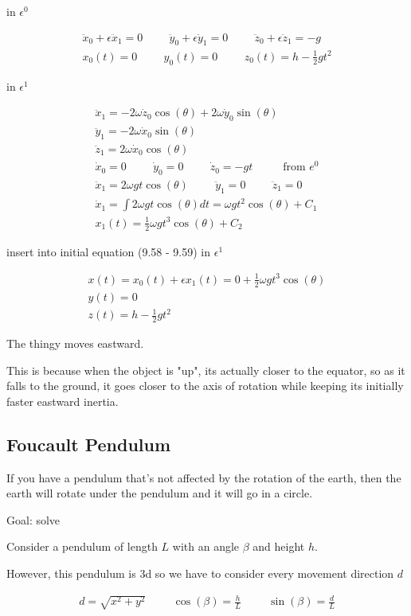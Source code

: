 \documentclass[fleqn]{report}
\newcommand{\hp}{\hspace{1cm}}
\newcommand{\equations} [1] {
\begin{gather*}
#1
\end{gather*}
}
\begin{document}

in $\epsilon^0$
\equations{
    \ddot x_0 + \epsilon \ddot x_1 = 0
    \hp
    \ddot y_0 + \epsilon \ddot y_1 = 0
    \hp
    \ddot z_0 + \epsilon \ddot z_1 = -g
    \\
    x_0(t) = 0
    \hp 
    y_0(t) = 0
    \hp 
    z_0(t) = h - \frac{1}{2} gt^2
}

in $\epsilon^1$
\equations{
    \ddot x_1 = 
    -2 \omega \dot z_0 \cos(\theta) +
    2 \omega \dot y_0 \sin(\theta)
    \\
    \ddot y_1 = -2 \omega \dot x_0 \sin(\theta)
    \\
    \ddot z_1 = 2 \omega \dot x_0 \cos(\theta)
    \\
    \dot x_0 = 0
    \hp 
    \dot y_0 = 0 
    \hp 
    \dot z_0 = -gt 
    \hp
    \textrm{ from $e^0$}
    \\
    \ddot x_1 = 2 \omega gt \cos(\theta)
    \hp
    \ddot y_1 = 0
    \hp 
    \ddot z_1 = 0
    \\
    \dot x_1 = \int 2 \omega gt \cos(\theta) dt = 
    \omega gt^2 \cos(\theta) + C_1
    \\
    x_1(t) = \frac{1}{2} \omega gt^3 \cos(\theta) + C_2
}

insert into initial equation (9.58 - 9.59) in $\epsilon^1$
\equations{
    x(t) = x_0(t) + \epsilon x_1(t) =
    0 + \frac{1}{2} \omega gt^3 \cos(\theta) 
    \\
    y(t) = 0
    \\
    z(t) = h - \frac{1}{2} gt^2
}

The thingy moves eastward.

This is because when the object is "up", its actually closer to the equator,
so as it falls to the ground, it goes closer to the axis of rotation while 
keeping its initially faster eastward inertia. 

\subsection{Foucault Pendulum}
If you have a pendulum that's not affected by the rotation of the earth, 
then the earth will rotate under the pendulum and it will go 
in a circle. 

Goal: solve 

Consider a pendulum of length $L$ with an angle $\beta$ and height $h$.

However, this pendulum is 3d so we have to consider every movement direction $d$
\equations{
    d = \sqrt{x^2 + y^2}
    \hp 
    \cos(\beta) = \frac{h}{L}
    \hp 
    \sin(\beta) = \frac{d}{L}
}
\end{document}
